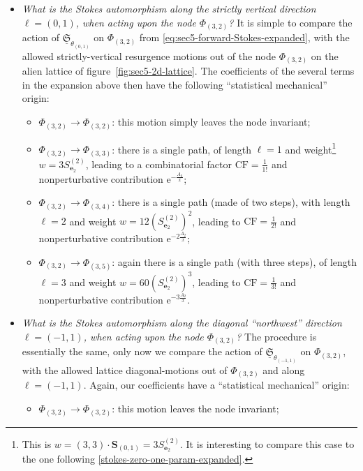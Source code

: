 \documentclass[11pt,a4paper]{article}
\newcommand{\rme}{{\mathrm{e}}}
\begin{document}
\begin{itemize}
%
\item \textit{What is the Stokes automorphism along the strictly vertical direction $\boldsymbol{\ell}=(0,1)$, when acting upon the node $\Phi_{(3,2)}$?} It is simple to compare the action of $\underline{\mathfrak{S}}_{\theta_{(0,1)}}$ on $\Phi_{(3,2)}$ from \eqref{eq:sec5-forward-Stokes-expanded}, with the allowed strictly-vertical resurgence motions out of the node $\Phi_{(3,2)}$ on the alien lattice of figure~\ref{fig:sec5-2d-lattice}. The coefficients of the several terms in the expansion above then have the following ``statistical mechanical'' origin:
%
\begin{itemize}
%
\item $\Phi_{(3,2)}\rightarrow\Phi_{(3,2)}$: this motion simply leaves the node invariant;
%
\item $\Phi_{(3,2)}\rightarrow\Phi_{(3,3)}$: there is a single path, of length
$\ell=1$ and weight\footnote{This is $w = (3,3) \cdot \boldsymbol{S}_{(0,1)} = 3 S^{(2)}_{\boldsymbol{e}_2}$. It is interesting to compare this case to the one following \eqref{stokes-zero-one-param-expanded}.} $w = 3 S^{(2)}_{\boldsymbol{e}_2}$, leading to a combinatorial factor $\mathrm{CF}=\frac{1}{1!}$ and nonperturbative contribution $\rme^{-\frac{A_2}{x}}$;
%
\item $\Phi_{(3,2)}\rightarrow\Phi_{(3,4)}$: there is a single path (made of two steps), with length $\ell=2$ and weight $w = 12 \left( S^{(2)}_{\boldsymbol{e}_2} \right)^2$, leading to $\mathrm{CF}=\frac{1}{2!}$ and nonperturbative contribution $\rme^{-2\frac{A_2}{x}}$;
%
\item $\Phi_{(3,2)}\rightarrow\Phi_{(3,5)}$: again there is a single path (with three steps), of length $\ell=3$ and weight $w = 60 \left( S^{(2)}_{\boldsymbol{e}_2} \right)^3$, leading to $\mathrm{CF}=\frac{1}{3!}$ and nonperturbative contribution $\rme^{-3\frac{A_2}{x}}$.
%
\end{itemize}
%
\item \textit{What is the Stokes automorphism along the diagonal ``northwest'' direction $\boldsymbol{\ell}=(-1,1)$, when acting upon the node $\Phi_{(3,2)}$?} The procedure is essentially the same, only now we compare the action of $\underline{\mathfrak{S}}_{\theta_{(-1,1)}}$ on $\Phi_{(3,2)}$, with the allowed lattice diagonal-motions out of $\Phi_{(3,2)}$ and along $\boldsymbol{\ell}=(-1,1)$. Again, our coefficients have a ``statistical mechanical'' origin:
%
\begin{itemize}
%
\item $\Phi_{(3,2)}\rightarrow\Phi_{\left(3,2\right)}$: this motion leaves the node invariant;

\end{itemize}
\end{itemize}
\end{document}
